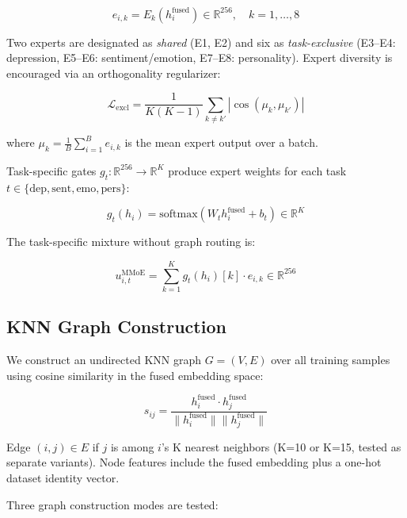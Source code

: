\documentclass[12pt,oneside]{book}
\begin{document}
\begin{equation}
    e_{i,k} = E_k(h_i^{\text{fused}}) \in \mathbb{R}^{256}, \quad k=1,\ldots,8
\end{equation}

Two experts are designated as \emph{shared} (E1, E2) and six as \emph{task-exclusive} (E3--E4: depression, E5--E6: sentiment/emotion, E7--E8: personality). Expert diversity is encouraged via an orthogonality regularizer:

\begin{equation}
    \mathcal{L}_{\text{excl}} = \frac{1}{K(K-1)} \sum_{k \neq k'} |\cos(\mu_k, \mu_{k'})|
\end{equation}

where $\mu_k = \frac{1}{B} \sum_{i=1}^B e_{i,k}$ is the mean expert output over a batch.

Task-specific gates $g_t: \mathbb{R}^{256} \to \mathbb{R}^K$ produce expert weights for each task $t \in \{\text{dep}, \text{sent}, \text{emo}, \text{pers}\}$:

\begin{equation}
    g_t(h_i) = \text{softmax}(W_t h_i^{\text{fused}} + b_t) \in \mathbb{R}^K
\end{equation}

The task-specific mixture without graph routing is:

\begin{equation}
    u_{i,t}^{\text{MMoE}} = \sum_{k=1}^K g_t(h_i)[k] \cdot e_{i,k} \in \mathbb{R}^{256}
\end{equation}

\subsection{KNN Graph Construction}

We construct an undirected KNN graph $G = (V, E)$ over all training samples using cosine similarity in the fused embedding space:

\begin{equation}
    s_{ij} = \frac{h_i^{\text{fused}} \cdot h_j^{\text{fused}}}{\|h_i^{\text{fused}}\| \|h_j^{\text{fused}}\|}
\end{equation}

Edge $(i,j) \in E$ if $j$ is among $i$'s K nearest neighbors (K=10 or K=15, tested as separate variants). Node features include the fused embedding plus a one-hot dataset identity vector.

Three graph construction modes are tested:
\end{document}
